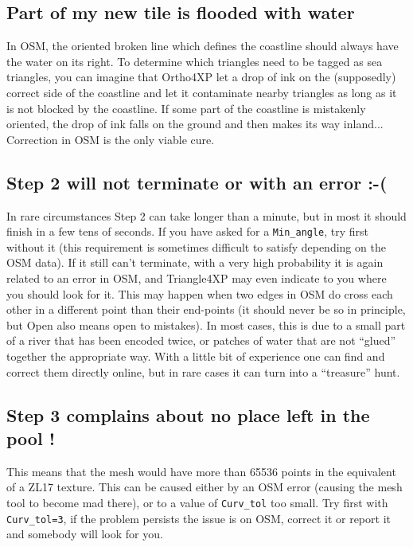 \documentclass[12pt]{article}
\begin{document}
\subsection{Part of my new tile is flooded with water}
In OSM, the oriented broken line which defines the coastline should always have the water on its right. To determine which triangles need to be tagged as sea triangles, you can imagine that Ortho4XP let a drop of ink on the (supposedly) correct side of the coastline and let it contaminate nearby triangles as long as it is not blocked by the coastline. If some part of the coastline is mistakenly oriented, the drop of ink falls on the ground and then makes its way inland...
Correction in OSM is the only viable cure.

\subsection{Step 2 will not terminate or with an error :-(}\label{crash}
In rare circumstances Step 2 can take longer than a minute, but in most it should finish in a few tens of seconds. If you have asked for a {\tt Min\_angle}, try first without it (this requirement is sometimes difficult to satisfy depending on the OSM data). If it still can't terminate, with a very high probability it is again related to an error in OSM, and Triangle4XP may even indicate to you where you should look for it.
This may happen when two edges in OSM do cross each other in a different point than their end-points (it should never be so in principle, but Open also means open to mistakes).
In most cases, this is due to a small part of a river that has been encoded twice, or patches of water that are not ``glued'' together the appropriate way. With a little bit of experience one can find and correct them directly online, but in rare cases it can turn into a ``treasure'' hunt.

\subsection{Step 3 complains about no place left in the pool !}
This means that the mesh would have more than 65536 points in the equivalent of a ZL17 texture.
This can be caused either by an OSM error (causing the mesh tool to become mad there), or to a value of {\tt Curv\_tol} too small. Try first with {\tt Curv\_tol=3}, if the problem persists the issue is on OSM, correct it or report it and somebody will look for you.
\end{document}
